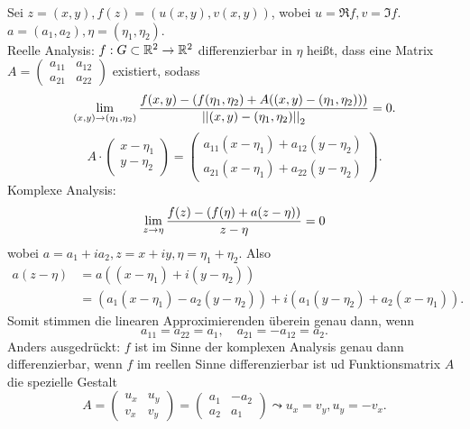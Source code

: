 \documentclass[../ana2u.tex]{subfiles}
\begin{document}
Sei \(z = (x,y), f(z) = (u(x,y), v(x,y))\), wobei \(u = \Re f, 
v = \Im f\).
\( a = (a_1, a_2), \eta = (\eta_1, \eta_2) \).\\
Reelle Analysis: 
\( f:G\subset \mathbb{R}^2\rightarrow \mathbb{R}^2 \) differenzierbar in \( \eta \)
heißt, dass eine Matrix \( A = \begin{pmatrix}
    a_{11} & a_{12} \\ a_{21} & a_{22}
\end{pmatrix} \) existiert, sodass
\[ \lim\limits_{(x,y)\rightarrow{}(\eta_1, \eta_2)} \frac{f(x,y)- 
(f(\eta_1, \eta_2) + A((x, y)-(\eta_1, \eta_2)))}
{\left|\left| (x,y) - (\eta_1, \eta_2) \right|\right|_2} = 0. \]
\[ A \cdot \begin{pmatrix} x - \eta_1\\ y - \eta_2 \end{pmatrix} 
    = \begin{pmatrix}
        a_{11}(x - \eta_1) + a_{12}(y - \eta_2) \\
        a_{21} (x - \eta_1) + a_{22}(y - \eta_2)
    \end{pmatrix}. \]
Komplexe Analysis:
\[ \lim\limits_{z\rightarrow{}\eta} \frac{f(z)- (f(\eta)+a(z-\eta))}{z - \eta} = 0 \]
wobei \( a = a_1 + i a_2, z = x + iy, 
\eta = \eta_1 + \eta_2 \). Also 
\begin{align*}
    a(z - \eta) &= a((x - \eta_1) + i(y - \eta_2))\\
    &= (a_1(x - \eta_1) - a_2(y - \eta_2)) 
    + i(a_1(y - \eta_2) + a_2(x - \eta_1)).
\end{align*}
Somit stimmen die linearen Approximierenden überein 
genau dann, wenn 
\[ a_{11} = a_{22} = a_1, \quad a_{21} = -a_{12} = a_2. \]
Anders ausgedrückt:    
\( f \) ist im Sinne der komplexen Analysis genau dann differenzierbar, 
wenn \(f\) im reellen Sinne differenzierbar ist ud Funktionsmatrix 
\(A\) die spezielle Gestalt 
\[ A = \begin{pmatrix} u_x & u_y \\ v_x & v_y \end{pmatrix} 
    = \begin{pmatrix} a_1 & -a_2 \\ a_2 & a_1 \end{pmatrix}
    \leadsto u_x = v_y, u_y = -v_x. \tag{Cauchy-Riemann DGL} \]
\end{document}

